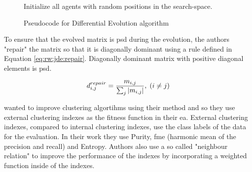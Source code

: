 \documentclass[12pt,a4paper]{report}
\begin{document}


\begin{figure}
\begin{algorithm}[H]
\DontPrintSemicolon
\LinesNumbered
{}
Initialize all agents with random positions in the search-space.\;
\end{algorithm} 
\caption{Pseudocode for Differential Evolution algorithm} \label{pseudo:de}
\end{figure}

To ensure that the evolved matrix is \ac{psd} during the evolution, the authors "repair" the matrix so that it is diagonally dominant using a rule defined in Equation \ref{eq:rw:jde:repair}. Diagonally dominant matrix with positive diagonal elements is \ac{psd}.

\begin{equation}
d_{i,j}^{repair} = \frac{m_{i,j}}{\sum_j \left|{m_{i,j}}\right|}, \; (i \neq j)
\label{eq:rw:jde:repair}
\end{equation}

\cite{fukui2013evolutionary} wanted to improve clustering algortihms using their method and so they use external clustering indexes as the fitness function in their \acl{ea}. External clustering indexes, compared to internal clustering indexes, use the class labels of the data for the evaluation. In their work they use Purity, \ac{fme} (harmonic mean of the precision and recall) and Entropy. Authors also use a so called "neighbour relation" to improve the performance of the indexes by incorporating a weighted function inside of the indexes. 
\end{document}
